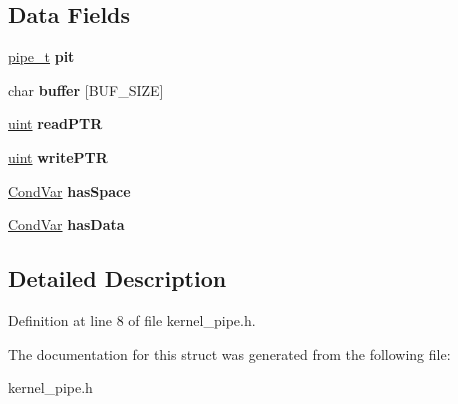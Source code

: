 \subsection*{Data Fields}
\begin{DoxyCompactItemize}
\item 
\mbox{\label{structpipe__control__block_a7aafe0b9d626ed7d9734045611e35b8b}} 
\hyperlink{group__syscalls_gad56b5ceaaf7d3ab88b4be7f622314dfb}{pipe\+\_\+t} {\bfseries pit}
\item 
\mbox{\label{structpipe__control__block_a13ac3b52cc8b912e0f3f6eea91edf07e}} 
char {\bfseries buffer} \mbox{[}B\+U\+F\+\_\+\+S\+I\+ZE\mbox{]}
\item 
\mbox{\label{structpipe__control__block_a30d49c572d80ed414a688d8796bae7d4}} 
\hyperlink{bios_8h_a91ad9478d81a7aaf2593e8d9c3d06a14}{uint} {\bfseries read\+P\+TR}
\item 
\mbox{\label{structpipe__control__block_a5f2e65ce1a934611fa10c800743f4b3b}} 
\hyperlink{bios_8h_a91ad9478d81a7aaf2593e8d9c3d06a14}{uint} {\bfseries write\+P\+TR}
\item 
\mbox{\label{structpipe__control__block_a0f9090b8a6b686261689feb01aae24ed}} 
\hyperlink{structCondVar}{Cond\+Var} {\bfseries has\+Space}
\item 
\mbox{\label{structpipe__control__block_a3c1b6d148eb07ba94c8286329d5db3cd}} 
\hyperlink{structCondVar}{Cond\+Var} {\bfseries has\+Data}
\end{DoxyCompactItemize}


\subsection{Detailed Description}


Definition at line 8 of file kernel\+\_\+pipe.\+h.



The documentation for this struct was generated from the following file\+:\begin{DoxyCompactItemize}
\item 
kernel\+\_\+pipe.\+h\end{DoxyCompactItemize}
